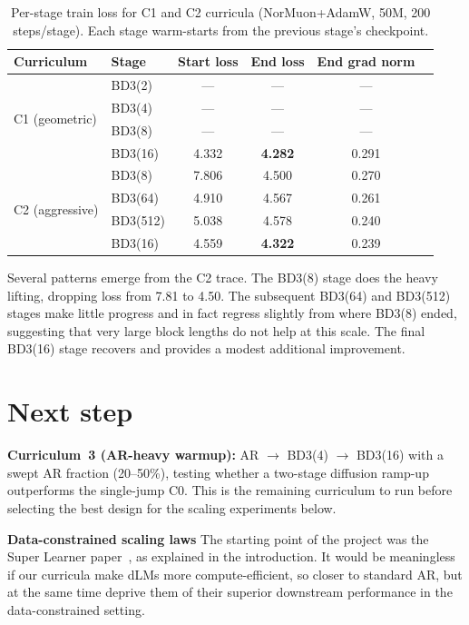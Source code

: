 \documentclass{article}
\begin{document}
\begin{table}[h]
\centering
\caption{Per-stage train loss for C1 and C2 curricula (NorMuon+AdamW, 50M,
200 steps/stage).  Each stage warm-starts from the previous stage's
checkpoint.}
\label{tab:c1c2}
\vspace{2pt}
\small
\begin{tabular}{llcccc}
\toprule
Curriculum & Stage & Start loss & End loss & End grad norm \\
\midrule
\multirow{4}{*}{C1 (geometric)}
 & BD3(2)  & --- & --- & --- \\
 & BD3(4)  & --- & --- & --- \\
 & BD3(8)  & --- & --- & --- \\
 & BD3(16) & 4.332 & \textbf{4.282} & 0.291 \\
\midrule
\multirow{4}{*}{C2 (aggressive)}
 & BD3(8)   & 7.806 & 4.500 & 0.270 \\
 & BD3(64)  & 4.910 & 4.567 & 0.261 \\
 & BD3(512) & 5.038 & 4.578 & 0.240 \\
 & BD3(16)  & 4.559 & \textbf{4.322} & 0.239 \\
\bottomrule
\end{tabular}
\vspace{-8pt}
\end{table}

Several patterns emerge from the C2 trace.  The BD3(8) stage does the heavy
lifting, dropping loss from 7.81 to 4.50.  The subsequent BD3(64) and
BD3(512) stages make little progress and in fact regress slightly from where
BD3(8) ended, suggesting that very large block lengths do not help at this
scale.  The final BD3(16) stage recovers and provides a modest additional
improvement.


\section{Next step}\label{sec:4}
\label{sec:discussion}

\textbf{Curriculum~3 (AR-heavy warmup):}
AR $\to$ BD3(4) $\to$ BD3(16) with a swept AR fraction (20--50\%),
testing whether a two-stage diffusion ramp-up outperforms the single-jump C0.
This is the remaining curriculum to run before selecting the best design for
the scaling experiments below.

\textbf{Data-constrained scaling laws}
The starting point of the project was the Super Learner paper~\citep{ni2025diffusionlanguagemodelssuper}, as explained in the introduction. It would be meaningless if our curricula make dLMs more compute-efficient, so closer to standard AR, but at the same time deprive them of their superior downstream performance in the data-constrained setting.
\end{document}
